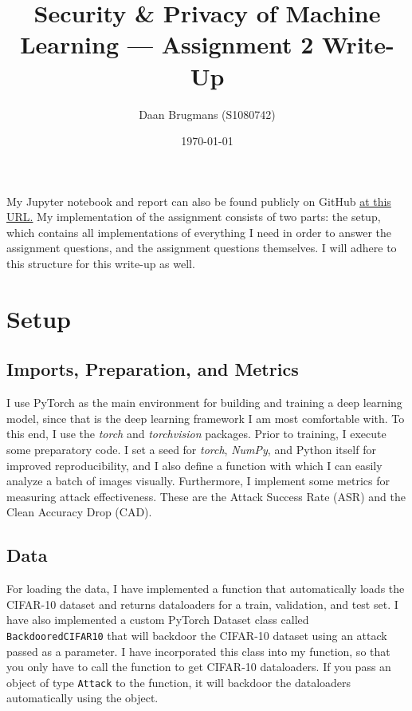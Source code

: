 \documentclass{article}
\begin{document}
\title{Security \& Privacy of Machine Learning --- Assignment 2 Write-Up}
\author{Daan Brugmans (S1080742)}
\date{\today}

\maketitle

My Jupyter notebook and report can also be found publicly on GitHub \href{https://github.com/daanbrugmans/ru-security-and-privacy-of-machine-learning-23-24/tree/main/assignments/assignment-2}{at this URL.}
My implementation of the assignment consists of two parts: the setup, which contains all implementations of everything I need in order to answer the assignment questions, and the assignment questions themselves.
I will adhere to this structure for this write-up as well.

\section{Setup}
\subsection{Imports, Preparation, and Metrics}
I use PyTorch as the main environment for building and training a deep learning model, since that is the deep learning framework I am most comfortable with. 
To this end, I use the \textit{torch} and \textit{torchvision} packages.
Prior to training, I execute some preparatory code.
I set a seed for \textit{torch}, \textit{NumPy}, and Python itself for improved reproducibility, and I also define a function with which I can easily analyze a batch of images visually.
Furthermore, I implement some metrics for measuring attack effectiveness.
These are the Attack Success Rate (ASR) and the Clean Accuracy Drop (CAD).

\subsection{Data}
For loading the data, I have implemented a function that automatically loads the CIFAR-10 dataset and returns dataloaders for a train, validation, and test set.
I have also implemented a custom PyTorch Dataset class called \texttt{BackdooredCIFAR10} that will backdoor the CIFAR-10 dataset using an attack passed as a parameter.
I have incorporated this class into my function, so that you only have to call the function to get CIFAR-10 dataloaders.
If you pass an object of type \texttt{Attack} to the function, it will backdoor the dataloaders automatically using the object.
\end{document}
